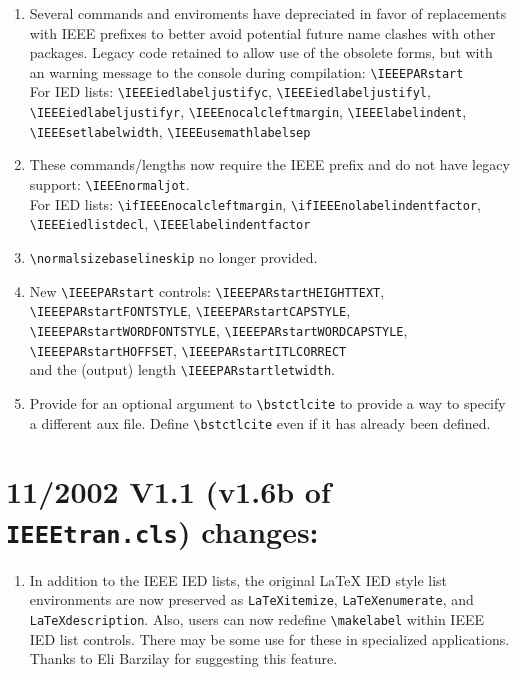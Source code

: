 \documentclass[pagesize=auto]{scrartcl}
\begin{document}
\begin{enumerate}
\item Several commands and enviroments have depreciated in favor of
  replacements with IEEE prefixes to better avoid potential future name
  clashes with other packages. Legacy code retained to allow use of the
  obsolete forms, but with an warning message to the console during
  compilation:
  \verb+\IEEEPARstart+\\
  For IED lists:
  \verb+\IEEEiedlabeljustifyc+, \verb+\IEEEiedlabeljustifyl+,\\ \verb+\IEEEiedlabeljustifyr+,
  \verb+\IEEEnocalcleftmargin+, \verb+\IEEElabelindent+,\\ \verb+\IEEEsetlabelwidth+,
  \verb+\IEEEusemathlabelsep+
\item These commands/lengths now require the IEEE prefix and do not have
  legacy support: \verb+\IEEEnormaljot+.\\
  For IED lists: \verb+\ifIEEEnocalcleftmargin+, \verb+\ifIEEEnolabelindentfactor+,\\
  \verb+\IEEEiedlistdecl+, \verb+\IEEElabelindentfactor+
\item \verb+\normalsizebaselineskip+ no longer provided.
\item New \verb+\IEEEPARstart+ controls:
  \verb+\IEEEPARstartHEIGHTTEXT+,\\ \verb+\IEEEPARstartFONTSTYLE+, \verb+\IEEEPARstartCAPSTYLE+,\\
  \verb+\IEEEPARstartWORDFONTSTYLE+, \verb+\IEEEPARstartWORDCAPSTYLE+,\\
  \verb+\IEEEPARstartHOFFSET+, \verb+\IEEEPARstartITLCORRECT+\\
  and the (output) length \verb+\IEEEPARstartletwidth+.
\item Provide for an optional argument to \verb+\bstctlcite+ to provide a way to
  specify a different aux file. Define \verb+\bstctlcite+ even if it has already
  been defined.
\end{enumerate}


\section{11/2002 V1.1 (v1.6b of \texttt{IEEEtran.cls}) changes:}

\begin{enumerate}
\item In addition to the IEEE IED lists, the original LaTeX IED style list
  environments are now preserved as \texttt{LaTeXitemize}, \texttt{LaTeXenumerate}, and
  \texttt{LaTeXdescription}. Also, users can now redefine \verb+\makelabel+ within
  IEEE IED list controls. There may be some use for these in specialized
  applications. Thanks to Eli Barzilay for suggesting this feature.
\end{enumerate}
\end{document}
